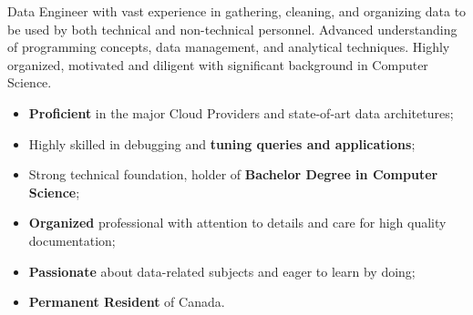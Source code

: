 \documentclass[10pt,a4paper]{gmelocv}
\begin{document}


\makecvheader


\justifying
    Data Engineer with vast experience in gathering, cleaning, and organizing data to be used by both technical and non-technical personnel. Advanced understanding of programming concepts, data management, and analytical techniques. Highly organized, motivated and diligent with significant background in Computer Science.



\begin{itemize}
  \item \textbf{Proficient} in the major Cloud Providers and state-of-art data architetures;
  \item Highly skilled in debugging and \textbf{tuning queries and applications};
  \item Strong technical foundation, holder of \textbf{Bachelor Degree in Computer Science};
  \item \textbf{Organized} professional with attention to details and care for high quality documentation;
  \item \textbf{Passionate} about data-related subjects and eager to learn by doing;
  \item \textbf{Permanent Resident} of Canada.
\end{itemize}


\end{document}
